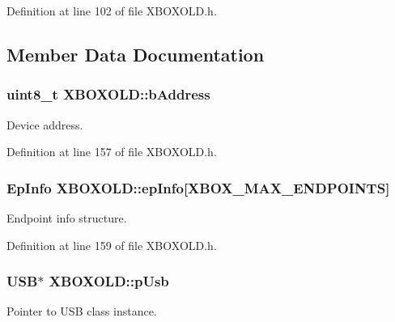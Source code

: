 \-Definition at line 102 of file \-X\-B\-O\-X\-O\-L\-D.\-h.



\subsection{\-Member \-Data \-Documentation}
\hypertarget{class_x_b_o_x_o_l_d_ae28d3306b484750d7067fa5f7ed0beae}{
\subsubsection[{b\-Address}]{\setlength{\rightskip}{0pt plus 5cm}uint8\-\_\-t {\bf \-X\-B\-O\-X\-O\-L\-D\-::b\-Address}}}\label{class_x_b_o_x_o_l_d_ae28d3306b484750d7067fa5f7ed0beae}
\-Device address. 

\-Definition at line 157 of file \-X\-B\-O\-X\-O\-L\-D.\-h.

\hypertarget{class_x_b_o_x_o_l_d_a06a318db8037f25a8d9bb62785dbacb9}{
\subsubsection[{ep\-Info}]{\setlength{\rightskip}{0pt plus 5cm}\-Ep\-Info {\bf \-X\-B\-O\-X\-O\-L\-D\-::ep\-Info}\mbox{[}{\bf \-X\-B\-O\-X\-\_\-\-M\-A\-X\-\_\-\-E\-N\-D\-P\-O\-I\-N\-T\-S}\mbox{]}}}\label{class_x_b_o_x_o_l_d_a06a318db8037f25a8d9bb62785dbacb9}
\-Endpoint info structure. 

\-Definition at line 159 of file \-X\-B\-O\-X\-O\-L\-D.\-h.

\hypertarget{class_x_b_o_x_o_l_d_a2b4d7d994ab6f5e1d1344d4162e9f5fb}{
\subsubsection[{p\-Usb}]{\setlength{\rightskip}{0pt plus 5cm}\-U\-S\-B$\ast$ {\bf \-X\-B\-O\-X\-O\-L\-D\-::p\-Usb}}}\label{class_x_b_o_x_o_l_d_a2b4d7d994ab6f5e1d1344d4162e9f5fb}
\-Pointer to \-U\-S\-B class instance. 

